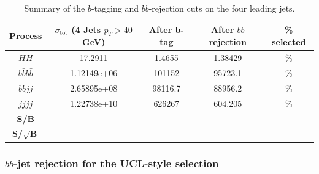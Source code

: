 \documentclass[12pt]{article}
\begin{document}
\begin{table}[h]
\begin{center}
\begin{tabular}{|c|c|c|c|c|}
\hline
Process & $\sigma_{\mathrm{tot}}$ (4 Jets $p_T>40$ GeV) & After b-tag & After $bb$ rejection & \% selected  \\
\hline \hline
$H\bar{H}$ & 17.2911 & 1.4655 & 1.38429 & \% \\
\hline
$b\bar{b}b\bar{b}$ & 1.12149e+06 & 101152 & 95723.1 & \% \\
$b\bar{b}jj$ & 2.65895e+08 & 98116.7 & 88956.2 & \% \\
$jjjj$ & 1.22738e+10 & 626267 & 604.205 & \% \\
\hline
\textbf{S/B} & & & & \multicolumn{1}{c}{}\\
\cline{1-3}
\textbf{S/$\sqrt{\mathrm{\textbf{B}}}$}& & & & \multicolumn{1}{c}{}\\
\cline{1-3}
\end{tabular}
\end{center}
\caption{Summary of the $b$-tagging and $bb$-rejection cuts on the four leading jets.}\label{tab:TestbbTag}
\end{table}%


\subsubsection{$bb$-jet rejection for the UCL-style selection}
\end{document}
